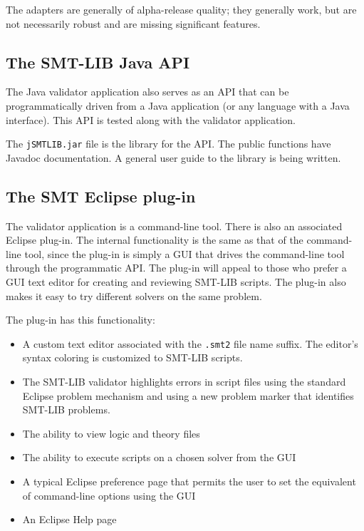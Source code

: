 \documentclass[12pt,oneside]{report}
\begin{document}
The adapters are generally of alpha-release quality; they generally work, but are not necessarily robust and are missing significant features.

\subsection{The SMT-LIB Java API}

The Java validator application also serves as an API that can be programmatically driven from a Java application (or any language
with a Java interface). This API is tested along with the validator application.

The {\tt jSMTLIB.jar} file is the library for the API. The public functions have Javadoc documentation.
A general user guide to the library is being written.


\subsection{The SMT Eclipse plug-in}

The validator application is a command-line tool. There is also an associated Eclipse plug-in. 
The internal functionality is the
same as that of the command-line tool, since the plug-in is simply a GUI that drives the command-line tool through the 
programmatic API. The plug-in will appeal to those who prefer a GUI text editor for creating and reviewing SMT-LIB scripts. The plug-in
also makes it easy to try different solvers on the same problem.

The plug-in has this functionality:
\begin{itemize}
\item A custom text editor associated with the {\tt .smt2} file name suffix. The editor's syntax coloring is customized to SMT-LIB scripts.
\item The SMT-LIB validator highlights errors in script files using the standard Eclipse problem mechanism and using a new problem marker
that identifies SMT-LIB problems.
\item The ability to view logic and theory files
\item The ability to execute scripts on a chosen solver from the GUI
\item A typical Eclipse preference page that permits the user to set the equivalent of command-line options using the GUI
\item An Eclipse Help page
\end{itemize}
\end{document}
